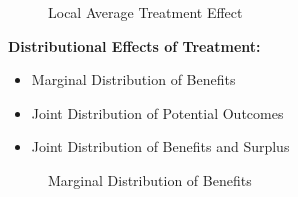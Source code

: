  
\begin{frame}
\begin{figure}[htp]\centering
	\caption{Local Average Treatment Effect}\label{Local Average Treatment}
\end{figure}
\end{frame} 
 
 
\begin{frame}  
\textbf{Distributional Effects of Treatment:}
\begin{itemize}
\item Marginal Distribution of Benefits
\item Joint Distribution of Potential Outcomes
\item Joint Distribution of Benefits and Surplus
\end{itemize}
\end{frame}


\begin{frame}
\begin{figure}[htp]\centering
	\caption{Marginal Distribution of Benefits}\label{Treatment Effects Benefits Marginal}
\end{figure}
\end{frame}


